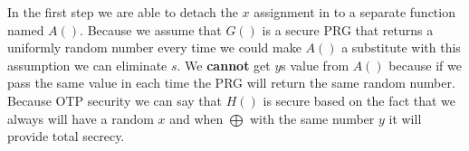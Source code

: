 \documentclass[letterpaper,12pt,notitlepage,fleqn]{article}
\begin{document}
\begin{center}
\begin{multicols}{2}
\begin{flushright}
\end{flushright}
\end{multicols}
\begin{multicols}{3}
\columnbreak
{}
\columnbreak
{}

\end{multicols}
\end{center}
In the first step we are able to detach the $x$ assignment in to a separate function named $A()$. Because we assume that $G()$ is a secure PRG that returns a uniformly random number every time we could make $A()$ a substitute with this assumption we can eliminate $s$. We \textbf{cannot} get $y$s value from $A()$ because if we pass the same value in each time the PRG will return the same random number. Because OTP security we can say that $H()$ is secure based on the fact that we always will have a random $x$ and when $\bigoplus$ with the same number $y$ it will provide total secrecy.
\end{document}

